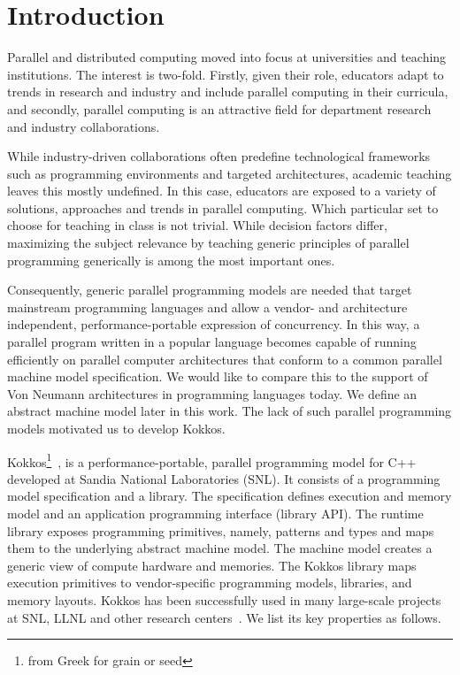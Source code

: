 
\section{Introduction}\label{chap:introduction}

Parallel and distributed computing moved into focus at universities and teaching institutions. The interest is two-fold. Firstly, given their role, educators adapt to trends in research and industry and include parallel computing in their curricula, and secondly, parallel computing is an attractive field for department research and industry collaborations. 

While industry-driven collaborations often predefine technological frameworks such as programming environments and targeted architectures, academic teaching leaves this mostly undefined. In this case, educators are exposed to a variety of solutions, approaches and trends in parallel computing. Which particular set to choose for teaching in class is not trivial. While decision factors differ, maximizing the subject relevance by teaching generic principles of parallel programming generically is among the most important ones. 

Consequently, generic parallel programming models are needed that target mainstream programming languages and allow a vendor- and architecture independent, performance-portable expression of concurrency. In this way, a parallel program written in a popular language becomes capable of running efficiently on parallel computer architectures that conform to a common parallel machine model specification. We would like to compare this to the support of Von Neumann architectures in programming languages today. We define an abstract machine model later in this work. The lack of such parallel programming models motivated us to develop Kokkos.

Kokkos\footnote{from Greek for grain or seed}~\cite{KOKKOS_PAPER_HERE}, is a performance-portable, parallel programming model for C++ developed at Sandia National Laboratories (SNL). It consists of a programming model specification and a library. The specification defines execution and memory model and an application programming interface (library API). The runtime library exposes programming primitives, namely, patterns and types and maps them to the underlying abstract machine model. The machine model creates a generic view of compute hardware and memories. The Kokkos library maps execution primitives to vendor-specific programming models, libraries, and memory layouts. Kokkos has been successfully used in many large-scale projects at SNL, LLNL and other research centers~\cite{CITEKOKKOSUSECASES}. We list its key properties as follows.

